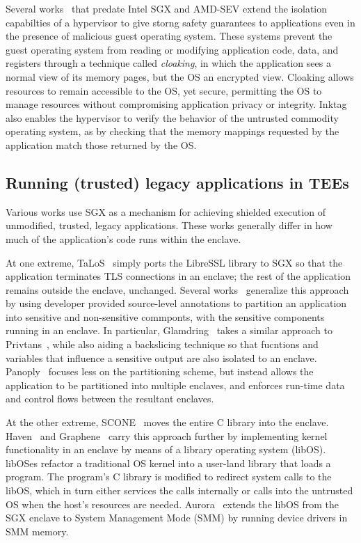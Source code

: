 %
Several works~\cite{overshadow,inktag} that predate Intel SGX and AMD-SEV
extend the isolation capabilties of a hypervisor to give storng safety
guarantees to applications even in the presence of malicious guest operating
system.
%
These systems prevent the guest operating system from reading or modifying
application code, data, and registers through a technique called
\emph{cloaking}, in which the application sees a normal view of its memory
pages, but the OS an encrypted view.
%
Cloaking allows resources to remain accessible to the OS, yet secure,
permitting the OS to manage resources without compromising application
privacy or integrity.
%
Inktag also enables the hypervisor to verify the behavior of the untrusted
commodity operating system, as by checking that the memory mappings requested
by the application match those returned by the OS.


\subsection{Running (trusted) legacy applications in TEEs}
%
Various works use SGX as a mechanism for achieving shielded execution of
unmodified, trusted, legacy applications.
%
These works generally differ in how much of the application's code runs
within the enclave.

%
At one extreme, TaLoS~\cite{talos} simply ports the LibreSSL library to SGX so
that the application terminates TLS connections in an enclave; the rest of
the application remains outside the enclave, unchanged.
%
Several works~\cite{glamdring, panoply} generalize this approach by using developer
provided source-level annotations to partition an application into sensitive and
non-sensitive commponts, with the sensitive components running in an enclave.
%
In particular, Glamdring~\cite{glamdring} takes a similar approach to
Privtans~\cite{privtrans}, while also aiding a backslicing technique so that
fucntions and variables that influence a sensitive output are also isolated to
an enclave.  
%
Panoply~\cite{panoply} focuses less on the  partitioning scheme, but instead
allows the application to be partitioned into multiple enclaves, and
enforces run-time data and control flows between the resultant enclaves.


%
At the other extreme, SCONE~\cite{scone} moves the entire C library into the enclave.
%
Haven~\cite{haven} and Graphene~\cite{graphene} carry this approach further by
implementing kernel functionality in an enclave by means of a library operating
system (libOS).  libOSes refactor a traditional OS kernel into a user-land
library that loads a program.
%
The program's C library is modified to redirect system calls to the libOS, which
in turn either services the calls internally or calls into the untrusted OS
when the host's resources are needed.
%
Aurora~\cite{liang2018aurora} extends the libOS from the SGX enclave to System
Management Mode (SMM) by running device drivers in SMM memory.


